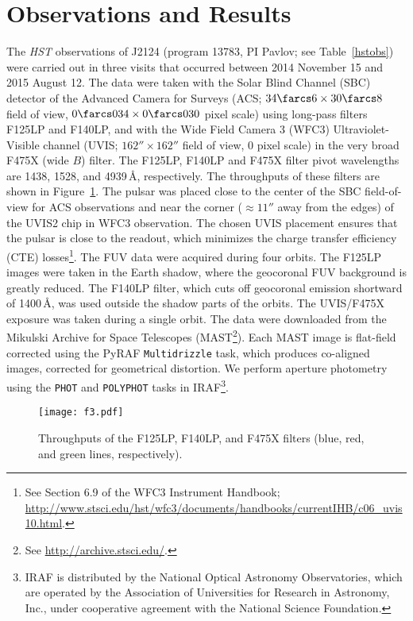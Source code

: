 \documentclass[iop]{emulateapj}
\begin{document}
\section{Observations and Results}

The \emph{HST} observations of J2124 (program 13783, PI Pavlov; see Table~\ref{hstobs}) were carried out in three visits that occurred between 2014 November 15 and 2015 August 12. The data were taken with the Solar Blind Channel (SBC) detector of the Advanced Camera for Surveys (ACS; $34\farcs6\times30\farcs8$ field of view, $0\farcs034\times0\farcs030$ pixel scale) using long-pass filters F125LP and F140LP, and  with the Wide Field Camera 3 (WFC3) Ultraviolet-Visible channel (UVIS; $162''\times162''$ field of view, 0 pixel scale) in the very broad F475X (wide $B$) filter. The F125LP, F140LP and F475X filter pivot wavelengths are 1438, 1528, and 4939\,\AA, respectively. The throughputs of these filters are shown in Figure~\ref{throughputs}. The pulsar was placed close to the center of the SBC field-of-view for ACS observations and near the corner ($\approx 11''$ away from the  edges) of the UVIS2 chip in WFC3 observation. The chosen UVIS placement ensures that the pulsar is close to the readout, which minimizes the charge transfer efficiency (CTE) losses\footnote{See Section 6.9 of the WFC3 Instrument Handbook; \url{http://www.stsci.edu/hst/wfc3/documents/handbooks/currentIHB/c06_uvis10.html}.}. The FUV data were acquired during four orbits. The F125LP images were taken in the Earth  shadow, where the geocoronal FUV background is greatly reduced.  The F140LP filter,  which cuts off geocoronal emission shortward of 1400\,\AA, was used outside the shadow parts of the orbits. The UVIS/F475X exposure was  taken during a single orbit. The data were downloaded from the Mikulski Archive for Space Telescopes (MAST\footnote{See \url{http://archive.stsci.edu/}.}). Each MAST image is flat-field corrected using the PyRAF {\tt Multidrizzle} task, which produces co-aligned images,  corrected for geometrical distortion. We perform aperture photometry using the \texttt{PHOT} and \texttt{POLYPHOT} tasks in IRAF\footnote{IRAF is distributed by the National Optical Astronomy Observatories, which are operated by the Association of Universities for Research in Astronomy, Inc., under cooperative agreement with the National Science Foundation.}.

\begin{figure}
\texttt{[image: f3.pdf]}
\caption{
Throughputs of the F125LP, F140LP, and F475X filters (blue, red, and green lines, respectively).
}
\label{throughputs}
\end{figure}
\end{document}
